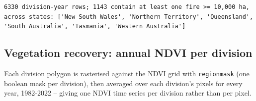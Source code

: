 \documentclass[
  letterpaper,
  DIV=11,
  numbers=noendperiod]{scrartcl}
\begin{document}
\begin{verbatim}
6330 division-year rows; 1143 contain at least one fire >= 10,000 ha, across states: ['New South Wales', 'Northern Territory', 'Queensland', 'South Australia', 'Tasmania', 'Western Australia']
\end{verbatim}

\subsection{Vegetation recovery: annual NDVI per
division}\label{vegetation-recovery-annual-ndvi-per-division}

Each division polygon is rasterised against the NDVI grid with
\texttt{regionmask} (one boolean mask per division), then averaged over
each division's pixels for every year, 1982-2022 -- giving one NDVI time
series per division rather than per pixel.
\end{document}
